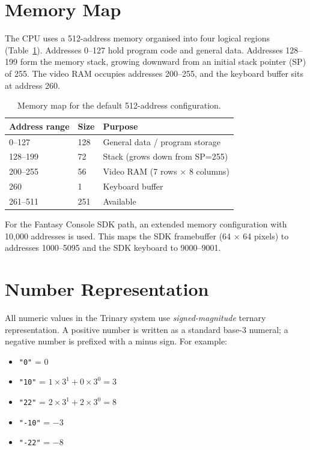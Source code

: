 \section{Memory Map}

The CPU uses a 512-address memory organised into four logical regions (Table~\ref{tab:memmap}). Addresses 0--127 hold program code and general data. Addresses 128--199 form the memory stack, growing downward from an initial stack pointer (SP) of 255. The video RAM occupies addresses 200--255, and the keyboard buffer sits at address 260.

\begin{table}[h]
\centering
\begin{tabular}{lll}
\toprule
Address range & Size & Purpose \\
\midrule
0--127   & 128  & General data / program storage \\
128--199 & 72   & Stack (grows down from SP=255) \\
200--255 & 56   & Video RAM (7 rows $\times$ 8 columns) \\
260      & 1    & Keyboard buffer \\
261--511 & 251  & Available \\
\bottomrule
\end{tabular}
\caption{Memory map for the default 512-address configuration.}
\label{tab:memmap}
\end{table}

For the Fantasy Console SDK path, an extended memory configuration with 10{,}000 addresses is used. This maps the SDK framebuffer (64 $\times$ 64 pixels) to addresses 1000--5095 and the SDK keyboard to 9000--9001.

\section{Number Representation}

All numeric values in the Trinary system use \emph{signed-magnitude} ternary representation. A positive number is written as a standard base-3 numeral; a negative number is prefixed with a minus sign. For example:

\begin{itemize}
    \item \texttt{"0"} = $0$
    \item \texttt{"10"} = $1 \times 3^1 + 0 \times 3^0 = 3$
    \item \texttt{"22"} = $2 \times 3^1 + 2 \times 3^0 = 8$
    \item \texttt{"-10"} = $-3$
    \item \texttt{"-22"} = $-8$
\end{itemize}

